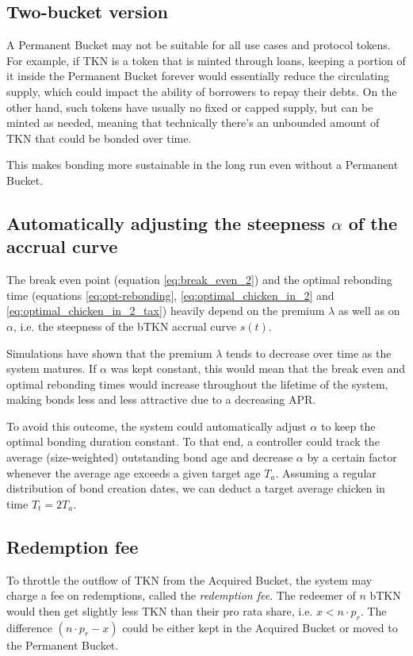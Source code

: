\documentclass{article}
\begin{document}
\subsection{Two-bucket version}
\label{sec:two-bucket}
A Permanent Bucket may not be suitable for all use cases and protocol tokens. For example, if TKN is a token that is minted through loans, keeping a portion of it inside the Permanent Bucket forever would essentially reduce the circulating supply, which could impact the ability of borrowers to repay their debts. On the other hand, such tokens have usually no fixed or capped supply, but can be minted as needed, meaning that technically there's an unbounded amount of TKN that could be bonded over time.

This makes bonding more sustainable in the long run even without a Permanent Bucket.


\subsection{Automatically adjusting the steepness $\alpha$ of the accrual curve}
  \label{sec:adjustment}
The break even point (equation \ref{eq:break_even_2}) and the optimal rebonding time (equations \ref{eq:opt-rebonding}, \ref{eq:optimal_chicken_in_2} and \ref{eq:optimal_chicken_in_2_tax}) heavily depend on the premium $\lambda$ as well as on $\alpha$, i.e. the steepness of the bTKN accrual curve $s(t)$. 

Simulations have shown that the premium $\lambda$ tends to decrease over time as the system matures. If  $\alpha$ was kept constant, this would mean that the break even and optimal rebonding times would increase throughout the lifetime of the system, making bonds less and less attractive due to a decreasing APR.

To avoid this outcome, the system could automatically adjust $\alpha$ to keep the optimal bonding duration constant. To that end, a controller could track the average (size-weighted) outstanding bond age and decrease $\alpha$ by a certain factor whenever the average age exceeds a given target age $T_a$. Assuming a regular distribution of bond creation dates, we can deduct a target average chicken in time $T_t = 2T_a$.

\subsection{Redemption fee}
  \label{sec:redemption-fee}
To throttle the outflow of TKN from the Acquired Bucket, the system may charge a fee on redemptions, called the \textit{redemption fee}. The redeemer of $n$ bTKN would then get slightly less TKN than their pro rata share, i.e. $x < n \cdot p_r$. The difference $(n \cdot p_r - x)$ could be either kept in the Acquired Bucket or moved to the Permanent Bucket. 
\end{document}
